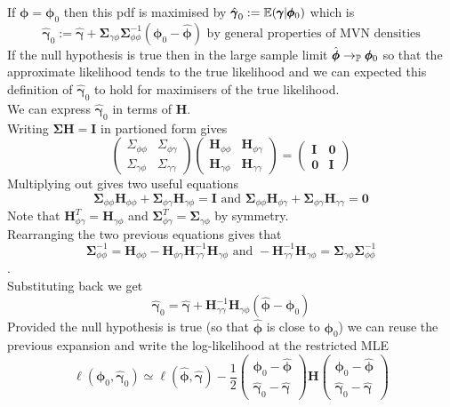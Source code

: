 \documentclass[11pt,a4paper]{article}
\begin{document}
If $\pmb\phi=\pmb\phi_0$ then this pdf is maximised by $\hat{\pmb\gamma}_0:=\mathbb{E}(\pmb\gamma|\pmb\phi_0)$ which is
$$\hat{\pmb\gamma}_0:=\hat{\pmb\gamma}+\pmb\Sigma_{\gamma\phi}\pmb\Sigma_{\phi\phi}^{-1}(\pmb\phi_0-\hat{\pmb\phi})\text{ by general properties of MVN densities}$$
If the null hypothesis is true then in the large sample limit $\hat{\pmb\phi}\to_{\mathbb{P}}\pmb\phi_0$ so that the approximate likelihood tends to the true likelihood and we can expected this definition of $\hat{\pmb\gamma}_0$ to hold for maximisers of the true likelihood.\\
We can express $\hat{\pmb\gamma}_0$ in terms of $\textbf{H}$.\\
Writing $\pmb\Sigma\textbf{H}=\textbf{I}$ in partioned form gives
$$\begin{pmatrix}\Sigma_{\phi\phi}&\Sigma_{\phi\gamma}\\\Sigma_{\gamma\phi}&\Sigma_{\gamma\gamma}\end{pmatrix}\begin{pmatrix}\textbf{H}_{\phi\phi}&\textbf{H}_{\phi\gamma}\\\textbf{H}_{\gamma\phi}&\textbf{H}_{\gamma\gamma}\end{pmatrix}=\begin{pmatrix}\textbf{I}&\pmb0\\\pmb0&\textbf{I}\end{pmatrix}$$
Multiplying out gives two useful equations
$$\pmb\Sigma_{\phi\phi}\textbf{H}_{\phi\phi}+\pmb\Sigma_{\phi\gamma}\textbf{H}_{\gamma\phi}=\textbf{I}\text{ and }\pmb\Sigma_{\phi\phi}\textbf{H}_{\phi\gamma}+\pmb\Sigma_{\phi\gamma}\textbf{H}_{\gamma\gamma}=\textbf{0}$$
Note that $\textbf{H}_{\phi\gamma}^T=\textbf{H}_{\gamma\phi}$ and $\pmb\Sigma_{\phi\gamma}^T=\pmb\Sigma_{\gamma\phi}$ by symmetry.\\
Rearranging the two previous equations gives that
$$\pmb\Sigma_{\phi\phi}^{-1}=\textbf{H}_{\phi\phi}-\textbf{H}_{\phi\gamma}\textbf{H}^{-1}_{\gamma\gamma}\textbf{H}_{\gamma\phi}\text{ and }-\textbf{H}_{\gamma\gamma}^{-1}\textbf{H}_{\gamma\phi}=\pmb\Sigma_{\gamma\phi}\pmb\Sigma_{\phi\phi}^{-1}$$.\\
Substituting back we get
$$\hat{\pmb\gamma}_0=\hat{\pmb\gamma}+\textbf{H}_{\gamma\gamma}^{-1}\textbf{H}_{\gamma\phi}(\hat{\pmb\phi}-\pmb\phi_0)$$
Provided the null hypothesis is true (so that $\hat{\pmb\phi}$ is close to $\pmb\phi_0$) we can reuse the previous expansion and write the log-likelihood at the restricted MLE
$$\ell(\pmb\phi_0,\hat{\pmb\gamma}_0)\simeq\ell(\hat{\pmb\phi},\hat{\pmb\gamma})-\frac12\begin{pmatrix}\pmb\phi_0-\hat{\pmb\phi}\\\hat{\pmb\gamma}_0-\hat{\pmb\gamma}\end{pmatrix}\textbf{H}\begin{pmatrix}\pmb\phi_0-\hat{\pmb\phi}\\\hat{\pmb\gamma}_0-\hat{\pmb\gamma}\end{pmatrix}$$
\end{document}
